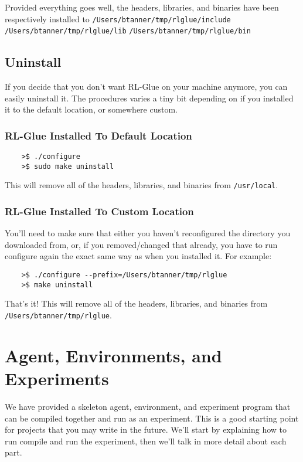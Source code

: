 \documentclass[11pt]{article}
\begin{document}
Provided everything goes well, the headers, libraries, and binaries have been respectively installed to\newline
\texttt{/Users/btanner/tmp/rlglue/include}\newline
\texttt{/Users/btanner/tmp/rlglue/lib}\newline
\texttt{/Users/btanner/tmp/rlglue/bin}


\subsection{Uninstall}
If you decide that you don't want  RL-Glue on your machine anymore, you can easily uninstall it.  The procedures varies a tiny bit depending on if you installed it to the default location, or somewhere custom.

\subsubsection{RL-Glue Installed To Default Location}
\begin{verbatim}
	>$ ./configure
	>$ sudo make uninstall
\end{verbatim}

This will remove all of the headers, libraries, and binaries from \texttt{/usr/local}.

\subsubsection{RL-Glue Installed To Custom Location}
You'll need to make sure that either you haven't reconfigured the directory you downloaded from, or, if you removed/changed that already, you have to run configure again the exact same way as when you installed it.  For example:
\begin{verbatim}
	>$ ./configure --prefix=/Users/btanner/tmp/rlglue
	>$ make uninstall
\end{verbatim}

That's it!  This will remove all of the headers, libraries, and binaries from \texttt{/Users/btanner/tmp/rlglue}.

\section{Agent, Environments, and Experiments}
We have provided a skeleton agent, environment, and experiment program that can be compiled together and run as an experiment.
This is a good starting point for projects that you may write in the future.  We'll start by explaining how to run compile and
run the experiment, then we'll talk in more detail about each part.
\end{document}
